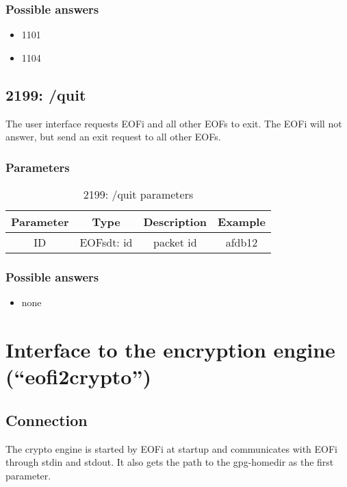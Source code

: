 \documentclass[12pt,a4paper]{book}
\begin{document}
\subsubsection{Possible answers}
\begin{itemize}
\item 1101
\item 1104
\end{itemize}
\subsection{2199: /quit}
The user interface requests EOFi and all other EOFs to exit.
The EOFi will not answer, but send an exit request to all other
EOFs.

\subsubsection{Parameters}
\begin{longtable}{|c|c|c|c|}
\caption{2199: /quit parameters}\\
\hline
\textbf{Parameter} & \textbf{Type} & \textbf{Description} & \textbf{Example}\\
\hline
ID & EOFsdt: id & packet id & afdb12\\
\hline
\end{longtable}

\subsubsection{Possible answers}
\begin{itemize}
\item none
\end{itemize}
\section{Interface to the encryption engine ("`eofi2crypto"')}
\label{eofi2crypto}
\subsection{Connection}
The crypto engine is started by EOFi at startup and communicates with EOFi
through stdin and stdout. It also gets the path to the gpg-homedir as the
first parameter.
\end{document}
